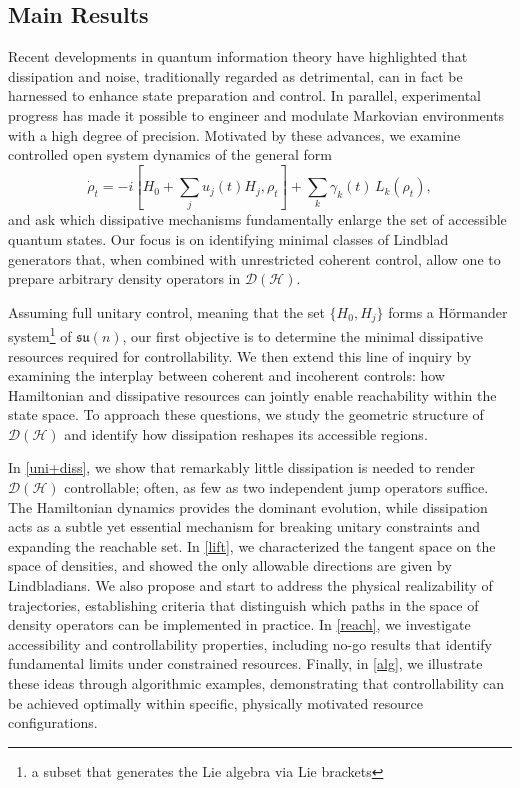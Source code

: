 \documentclass[11pt,reqno]{amsart}
\theoremstyle{definition}
\newcommand{\mc}{\mathcal}
\newcommand{\lbra}{\left[}
\newcommand{\rbra}{\right]}
\begin{document}
\subsection{Main Results}
Recent developments in quantum information theory have highlighted that dissipation and noise, traditionally regarded as detrimental, can in fact be harnessed to enhance state preparation and control. In parallel, experimental progress has made it possible to engineer and modulate Markovian environments with a high degree of precision. Motivated by these advances, we examine controlled open system dynamics of the general form
$$\dot\rho_t = -i\lbra H_0 + \sum_j u_j(t) H_j, \rho_t\rbra + \sum_k \gamma_k(t)\,L_k(\rho_t),$$
and ask which dissipative mechanisms fundamentally enlarge the set of accessible quantum states. Our focus is on identifying minimal classes of Lindblad generators that, when combined with unrestricted coherent control, allow one to prepare arbitrary density operators in $\mc D(\mc H)$.

Assuming full unitary control, meaning that the set $\{H_0, H_j\}$ forms a Hörmander system\footnote{a subset that generates the Lie algebra via Lie brackets} of $\mathfrak{su}(n)$, our first objective is to determine the minimal dissipative resources required for controllability. We then extend this line of inquiry by examining the interplay between coherent and incoherent controls: how Hamiltonian and dissipative resources can jointly enable reachability within the state space. To approach these questions, we study the geometric structure of $\mc D(\mc H)$ and identify how dissipation reshapes its accessible regions.

In \cref{uni+diss}, we show that remarkably little dissipation is needed to render $\mc D(\mc H)$ controllable; often, as few as two independent jump operators suffice. The Hamiltonian dynamics provides the dominant evolution, while dissipation acts as a subtle yet essential mechanism for breaking unitary constraints and expanding the reachable set.  
In \cref{lift}, we characterized the tangent space on the space of densities, and showed the only allowable directions are given by Lindbladians. We also propose and start to address the physical realizability of trajectories, establishing criteria that distinguish which paths in the space of density operators can be implemented in practice.
In \cref{reach}, we investigate accessibility and controllability properties, including no-go results that identify fundamental limits under constrained resources.  
Finally, in \cref{alg}, we illustrate these ideas through algorithmic examples, demonstrating that controllability can be achieved optimally within specific, physically motivated resource configurations.
\end{document}
